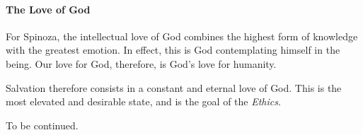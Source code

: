 \paragraph{The Love of God}
For Spinoza, the intellectual love of God combines the highest form of knowledge with the greatest emotion. In effect, this is God contemplating himself in the being. Our love for God, therefore, is God's love for humanity.

Salvation therefore consists in a constant and eternal love of God. This is the most elevated and desirable state, and is the goal of the \emph{Ethics}.

To be continued.

